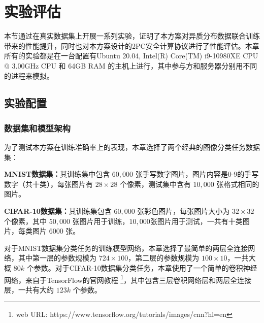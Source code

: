 \section{实验评估}\label{4-exp}
本节通过在真实数据集上开展一系列实验，证明了本方案对异质分布数据联合训练带来的性能提升，同时也对本方案设计的2PC安全计算协议进行了性能评估。本章所有的实验都是在一台配置有Ubuntu 20.04, Intel(R) Core(TM) i9-10980XE CPU @ 3.00GHz CPU 和 64GB RAM 的主机上进行，其中参与方和服务器分别用不同的进程来模拟。

\subsection{实验配置}

\subsubsection{数据集和模型架构}
为了测试本方案在训练准确率上的表现，本章选择了两个经典的图像分类任务数据集：
\begin{compactitem}
	\item \textbf{MNIST数据集：}其训练集中包含 $60,000$ 张手写数字图片，图片内容是0-9的手写数字（共十类），每张图片有 $28 \times28$ 个像素，测试集中含有 $10,000$ 张格式相同的图片。
	\item \textbf{CIFAR-10数据集：}其训练集包含 $60,000$ 张彩色图片，每张图片大小为 $32 \times 32$ 个像素，其中 $50,000$ 张图片用于训练，$10,000$张图片用于测试，一共有十类图片，每类图片 $6000$ 张。
\end{compactitem}
对于MNIST数据集分类任务的训练模型网络，本章选择了最简单的两层全连接网络，其中第一层的参数规模为 $724 \times 100$，第二层的参数规模为 $100 \times 10$，一共大概 $80k$ 个参数。对于CIFAR-10数据集分类任务，本章使用了一个简单的卷积神经网络，来自于TensorFlow的官网教程 \footnote{web URL: https://www.tensorflow.org/tutorials/images/cnn?hl=en}，其中包含三层卷积网络层和两层全连接层，一共有大约 $123k$ 个参数。


